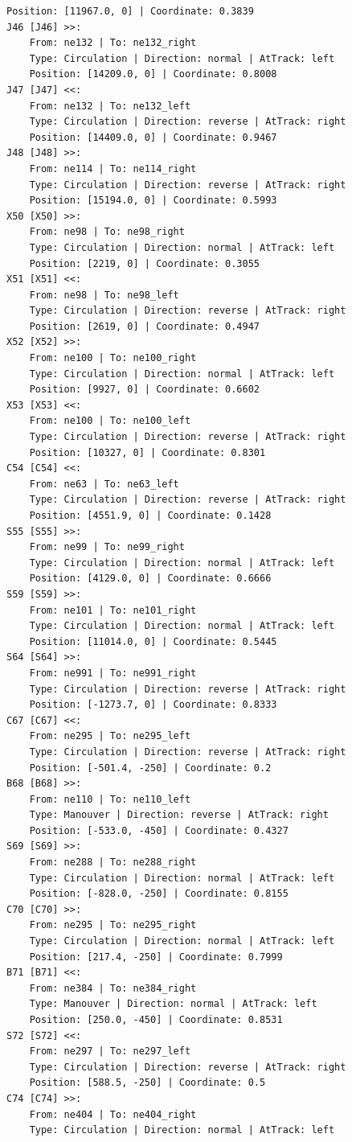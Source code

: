 \begin{lstlisting}[language = {}, tabsize=4, basicstyle=\footnotesize\ttfamily, showspaces=false, showstringspaces=false, caption = Signalling.RNA, label = {lst:EJ4_6}]
	Position: [11967.0, 0] | Coordinate: 0.3839
J46 [J46] >>:
	From: ne132 | To: ne132_right
	Type: Circulation | Direction: normal | AtTrack: left 
	Position: [14209.0, 0] | Coordinate: 0.8008
J47 [J47] <<:
	From: ne132 | To: ne132_left
	Type: Circulation | Direction: reverse | AtTrack: right 
	Position: [14409.0, 0] | Coordinate: 0.9467
J48 [J48] >>:
	From: ne114 | To: ne114_right
	Type: Circulation | Direction: reverse | AtTrack: right 
	Position: [15194.0, 0] | Coordinate: 0.5993
X50 [X50] >>:
	From: ne98 | To: ne98_right
	Type: Circulation | Direction: normal | AtTrack: left 
	Position: [2219, 0] | Coordinate: 0.3055
X51 [X51] <<:
	From: ne98 | To: ne98_left
	Type: Circulation | Direction: reverse | AtTrack: right 
	Position: [2619, 0] | Coordinate: 0.4947
X52 [X52] >>:
	From: ne100 | To: ne100_right
	Type: Circulation | Direction: normal | AtTrack: left 
	Position: [9927, 0] | Coordinate: 0.6602
X53 [X53] <<:
	From: ne100 | To: ne100_left
	Type: Circulation | Direction: reverse | AtTrack: right 
	Position: [10327, 0] | Coordinate: 0.8301
C54 [C54] <<:
	From: ne63 | To: ne63_left
	Type: Circulation | Direction: reverse | AtTrack: right 
	Position: [4551.9, 0] | Coordinate: 0.1428
S55 [S55] >>:
	From: ne99 | To: ne99_right
	Type: Circulation | Direction: normal | AtTrack: left 
	Position: [4129.0, 0] | Coordinate: 0.6666
S59 [S59] >>:
	From: ne101 | To: ne101_right
	Type: Circulation | Direction: normal | AtTrack: left 
	Position: [11014.0, 0] | Coordinate: 0.5445
S64 [S64] >>:
	From: ne991 | To: ne991_right
	Type: Circulation | Direction: reverse | AtTrack: right 
	Position: [-1273.7, 0] | Coordinate: 0.8333
C67 [C67] <<:
	From: ne295 | To: ne295_left
	Type: Circulation | Direction: reverse | AtTrack: right 
	Position: [-501.4, -250] | Coordinate: 0.2
B68 [B68] >>:
	From: ne110 | To: ne110_left
	Type: Manouver | Direction: reverse | AtTrack: right 
	Position: [-533.0, -450] | Coordinate: 0.4327
S69 [S69] >>:
	From: ne288 | To: ne288_right
	Type: Circulation | Direction: normal | AtTrack: left 
	Position: [-828.0, -250] | Coordinate: 0.8155
C70 [C70] >>:
	From: ne295 | To: ne295_right
	Type: Circulation | Direction: normal | AtTrack: left 
	Position: [217.4, -250] | Coordinate: 0.7999
B71 [B71] <<:
	From: ne384 | To: ne384_right
	Type: Manouver | Direction: normal | AtTrack: left 
	Position: [250.0, -450] | Coordinate: 0.8531
S72 [S72] <<:
	From: ne297 | To: ne297_left
	Type: Circulation | Direction: reverse | AtTrack: right 
	Position: [588.5, -250] | Coordinate: 0.5
C74 [C74] >>:
	From: ne404 | To: ne404_right
	Type: Circulation | Direction: normal | AtTrack: left 

\end{lstlisting}
